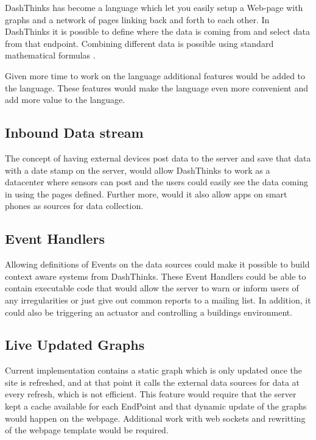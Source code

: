 \label{discussion}
DashThinks has become a language which let you easily setup a Web-page with graphs and a network
of pages linking back and forth to each other.
In DashThinks it is possible to define where the data is coming from and select data from that
endpoint. 
Combining different data is possible using standard mathematical formulas%
.

Given more time to work on the language additional features would be added to the language.
These features would make the language even more convenient and add more value to the language.

\subsection{Inbound Data stream} 
The concept of having external devices post data to the
server and save that data with a date stamp on the server, would allow DashThinks to work as a datacenter where sensors can post and the users could easily see
the data coming in using the pages defined. 
Further more, would it also allow apps on smart phones as sources for data collection.

\subsection{Event Handlers} 
Allowing definitions of Events on the data sources could make it possible to build context aware systems from DashThinks. 
These Event Handlers could be able to contain executable code that would allow the
server to warn or inform users of any irregularities or just give out common reports to
a mailing list.
In addition, it could also be triggering an actuator and controlling a buildings environment.

\subsection{Live Updated Graphs}
Current implementation contains a static
graph which is only updated once the site is refreshed, and at that point it calls the
external data sources for data at every refresh, which is not efficient. 
This feature would require that the server kept a cache available for each EndPoint and that dynamic
update of the graphs would happen on the webpage. 
Additional work with web sockets and
rewritting of the webpage template would be required. 

